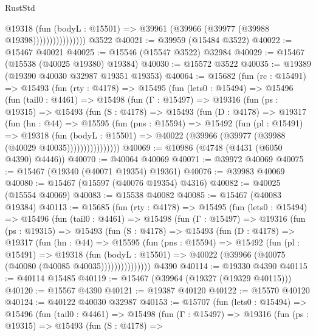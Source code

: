 \begin{lexlean}{RustStd}
\begin{coremodule}
                          @19318
                            (fun (bodyL : @15501) =>
                            @39961 (@39966 (@39977 (@39988 @19398))))))))))))))))
    @3522
@40021 := @39959 (@15484 @3522)
@40022 := @15467 @40021
@40025 := @15546 (@15547 @3522) @32984
@40029 := @15467 (@15538 (@40025 @19380) @19384)
@40030 := @15572 @3522
@40035 := @19389 (@19390 @40030 @32987 @19351 @19353)
@40064 := @15682
    (fun (rc : @15491) =>
    @15493
      (fun (rty : @4178) =>
      @15495
        (fun (lets0 : @15494) =>
        @15496
          (fun (tail0 : @4461) =>
          @15498
            (fun (Γ : @15497) =>
            @19316
              (fun (ps : @19315) =>
              @15493
                (fun (S : @4178) =>
                @15493
                  (fun (D : @4178) =>
                  @19317
                    (fun (hn : @44) =>
                    @15595
                      (fun (pns : @15594) =>
                      @15492
                        (fun (pl : @15491) =>
                        @19318
                          (fun (bodyL : @15501) =>
                          @40022 (@39966 (@39977 (@39988 (@40029 @40035))))))))))))))))
@40069 := @10986 (@4748 (@4431 (@6050 @4390) @4446))
@40070 := @40064 @40069
@40071 := @39972 @40069
@40075 := @15467 (@19340 (@40071 @19354) @19361)
@40076 := @39983 @40069
@40080 := @15467 (@15597 (@40076 @19354) @4316)
@40082 := @40025 (@15554 @40069)
@40083 := @15538 @40082
@40085 := @15467 (@40083 @19384)
@40113 := @15685
    (fun (rty : @4178) =>
    @15495
      (fun (lets0 : @15494) =>
      @15496
        (fun (tail0 : @4461) =>
        @15498
          (fun (Γ : @15497) =>
          @19316
            (fun (ps : @19315) =>
            @15493
              (fun (S : @4178) =>
              @15493
                (fun (D : @4178) =>
                @19317
                  (fun (hn : @44) =>
                  @15595
                    (fun (pns : @15594) =>
                    @15492
                      (fun (pl : @15491) =>
                      @19318
                        (fun (bodyL : @15501) =>
                        @40022 (@39966 (@40075 (@40080 (@40085 @40035)))))))))))))))
    @4390
@40114 := @19330 @4390
@40115 := @40114 @15485
@40119 := @15467 (@39964 (@19327 (@19329 @40115)))
@40120 := @15567 @4390
@40121 := @19387 @40120
@40122 := @15570 @40120
@40124 := @40122 @40030 @32987
@40153 := @15707
    (fun (lets0 : @15494) =>
    @15496
      (fun (tail0 : @4461) =>
      @15498
        (fun (Γ : @15497) =>
        @19316
          (fun (ps : @19315) =>
          @15493
            (fun (S : @4178) =>

\end{coremodule}
\end{lexlean}
